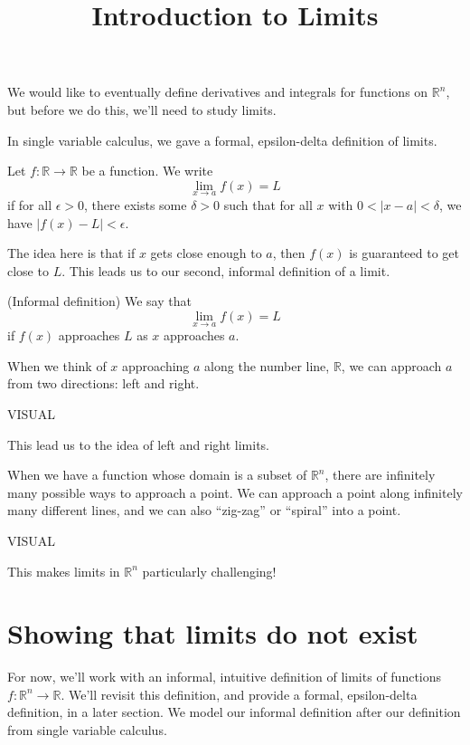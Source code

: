 \documentclass{ximera}
\title{Introduction to Limits}
\begin{document}
\begin{abstract}
\end{abstract}
\maketitle

We would like to eventually define derivatives and integrals for functions on $\mathbb{R}^n$, but before we do this, we'll need to study limits.

In single variable calculus, we gave a formal, epsilon-delta definition of limits.

\begin{definition}
Let $f:\mathbb{R}\rightarrow\mathbb{R}$ be a function. We write
\[
\lim_{x\rightarrow a} f(x) = L
\]
if for all $\epsilon >0$, there exists some $\delta >0$ such that for all $x$ with $0 < |x-a| < \delta$, we have $|f(x)-L| < \epsilon$.
\end{definition}

The idea here is that if $x$ gets close enough to $a$, then $f(x)$ is guaranteed to get close to $L$. This leads us to our second, informal definition of a limit.

\begin{definition}
(Informal definition) We say that
\[
\lim_{x\rightarrow a} f(x) = L
\]
if $f(x)$ approaches $L$ as $x$ approaches $a$.
\end{definition}

When we think of $x$ approaching $a$ along the number line, $\mathbb{R}$, we can approach $a$ from two directions: left and right.

VISUAL

This lead us to the idea of left and right limits.

When we have a function whose domain is a subset of $\mathbb{R}^n$, there are infinitely many possible ways to approach a point. We can approach a point along infinitely many different lines, and we can also ``zig-zag'' or ``spiral'' into a point.

VISUAL

This makes limits in $\mathbb{R}^n$ particularly challenging!

\section*{Showing that limits do not exist}

For now, we'll work with an informal, intuitive definition of limits of functions $f:\mathbb{R}^n\rightarrow\mathbb{R}$. We'll revisit this definition, and provide a formal, epsilon-delta definition, in a later section. We model our informal definition after our definition from single variable calculus.
\end{document}
